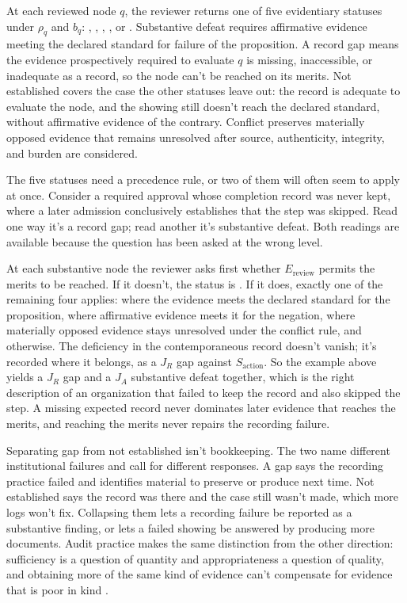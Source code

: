 At each reviewed node \(q\), the reviewer returns one of five evidentiary statuses under \(\rho_q\) and \(b_q\): , , , , or . Substantive defeat requires affirmative evidence meeting the declared standard for failure of the proposition. A record gap means the evidence prospectively required to evaluate \(q\) is missing, inaccessible, or inadequate as a record, so the node can't be reached on its merits. Not established covers the case the other statuses leave out: the record is adequate to evaluate the node, and the showing still doesn't reach the declared standard, without affirmative evidence of the contrary. Conflict preserves materially opposed evidence that remains unresolved after source, authenticity, integrity, and burden are considered.

The five statuses need a precedence rule, or two of them will often seem to apply at once. Consider a required approval whose completion record was never kept, where a later admission conclusively establishes that the step was skipped. Read one way it's a record gap; read another it's substantive defeat. Both readings are available because the question has been asked at the wrong level.

At each substantive node the reviewer asks first whether \(E_{\mathrm{review}}\) permits the merits to be reached. If it doesn't, the status is . If it does, exactly one of the remaining four applies:  where the evidence meets the declared standard for the proposition,  where affirmative evidence meets it for the negation,  where materially opposed evidence stays unresolved under the conflict rule, and  otherwise. The deficiency in the contemporaneous record doesn't vanish; it's recorded where it belongs, as a \(J_R\) gap against \(S_{\mathrm{action}}\). So the example above yields a \(J_R\) gap and a \(J_A\) substantive defeat together, which is the right description of an organization that failed to keep the record and also skipped the step. A missing expected record never dominates later evidence that reaches the merits, and reaching the merits never repairs the recording failure.

Separating gap from not established isn't bookkeeping. The two name different institutional failures and call for different responses. A gap says the recording practice failed and identifies material to preserve or produce next time. Not established says the record was there and the case still wasn't made, which more logs won't fix. Collapsing them lets a recording failure be reported as a substantive finding, or lets a failed showing be answered by producing more documents. Audit practice makes the same distinction from the other direction: sufficiency is a question of quantity and appropriateness a question of quality, and obtaining more of the same kind of evidence can't compensate for evidence that is poor in kind \citep{pcaob2024auditEvidence}.

